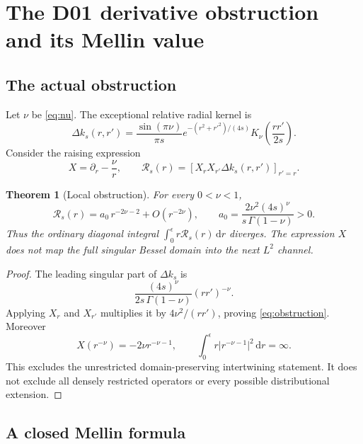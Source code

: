 \documentclass[11pt,a4paper]{article}
\newcommand{\dd}{\mathrm d}
\newcommand{\abs}[1]{\lvert#1\rvert}
\theoremstyle{plain}
\newtheorem{theorem}{Theorem}[section]
\theoremstyle{definition}
\theoremstyle{remark}
\numberwithin{equation}{section}
\begin{document}
\section{The D01 derivative obstruction and its Mellin value}
\label{sec:Mellin}

\subsection{The actual obstruction}

Let \(\nu\) be \eqref{eq:nu}. The exceptional relative radial
kernel is
\[
 \Delta k_s(r,r')
 =\frac{\sin(\pi\nu)}{\pi s}
   e^{-(r^2+r'^2)/(4s)}
   K_\nu\!\left(\frac{rr'}{2s}\right).
\]
Consider the raising expression
\[
 X=\partial_r-\frac{\nu}{r},
 \qquad
 \mathcal R_s(r)=
 \left[X_rX_{r'}\Delta k_s(r,r')\right]_{r'=r}.
\]

\begin{theorem}[Local obstruction]
\label{thm:obstruction}
For every \(0<\nu<1\),
\begin{equation}
 \mathcal R_s(r)
 =a_0\,r^{-2\nu-2}+O(r^{-2\nu}),
 \qquad
 a_0=\frac{2\nu^2(4s)^\nu}
               {s\,\Gamma(1-\nu)}>0.
 \label{eq:obstruction}
\end{equation}
Thus the ordinary diagonal integral
\(\int_0^\epsilon r\mathcal R_s(r)\,\dd r\) diverges.
The expression \(X\) does not map the full singular Bessel
domain into the next \(L^2\) channel.
\end{theorem}

\begin{proof}
The leading singular part of \(\Delta k_s\) is
\[
 \frac{(4s)^\nu}{2s\,\Gamma(1-\nu)}(rr')^{-\nu}.
\]
Applying \(X_r\) and \(X_{r'}\) multiplies it by
\(4\nu^2/(rr')\), proving \eqref{eq:obstruction}.
Moreover
\[
 X(r^{-\nu})=-2\nu r^{-\nu-1},
 \qquad
 \int_0^\epsilon r\abs{r^{-\nu-1}}^2\,\dd r=\infty.
\]
This excludes the unrestricted domain-preserving intertwining
statement. It does not exclude all densely restricted operators
or every possible distributional extension.
\end{proof}

\subsection{A closed Mellin formula}
\end{document}
